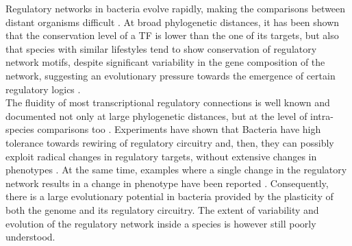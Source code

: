 Regulatory networks in bacteria evolve rapidly, making the comparisons between distant organisms difficult \cite{babu2006evolutionary, gelfand2006evolution, janga2007structure, lozada2006bacterial}. At broad phylogenetic distances, it has been shown that the conservation level of a TF is lower than the one of its targets, but also that species with similar lifestyles tend to show conservation of regulatory network motifs, despite significant variability in the gene composition of the network, suggesting an evolutionary pressure towards the emergence of certain regulatory logics \cite{babu2006evolutionary}.\\
The fluidity of most transcriptional regulatory connections is well known and documented not only at large phylogenetic distances, but at the level of intra-species comparisons too \cite{hendriksen2007regulation, brilli2010diversity, frandi2010comparative, galardini2011exploring}. 
Experiments have shown that Bacteria have high tolerance towards rewiring of regulatory circuitry and, then, they can possibly exploit radical changes in regulatory targets, without extensive changes in phenotypes \cite{isalan2008evolvability}. At the same time, examples where a single change in the regulatory network results in a change in phenotype have been reported \cite{somvanshi2012single, blount2012genomic}. Consequently, there is a large evolutionary potential in bacteria provided by the plasticity of both the genome and its regulatory circuitry. The extent of variability and evolution of the regulatory network inside a species is however still poorly understood.\\
